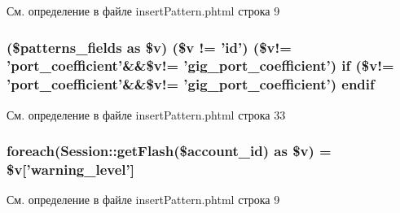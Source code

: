См. определение в файле insert\-Pattern.\-phtml строка 9

\hypertarget{insert_pattern_8phtml_afd53a91464451c8aabda435ff44bd275}{
\subsubsection[{endif}]{(\$patterns\-\_\-fields as \$v) (\$v != 'id') (\$v!= 'port\-\_\-coefficient'\&\&\$v!= 'gig\-\_\-port\-\_\-coefficient') if (\$v!= 'port\-\_\-coefficient'\&\&\$v!= 'gig\-\_\-port\-\_\-coefficient') endif}}\label{insert_pattern_8phtml_afd53a91464451c8aabda435ff44bd275}


См. определение в файле insert\-Pattern.\-phtml строка 33

\hypertarget{insert_pattern_8phtml_a1c191ff1be2612f80eabc75951f1841b}{
\subsubsection[{foreach}]{\setlength{\rightskip}{0pt plus 5cm}foreach({\bf Session\-::get\-Flash}(\$account\-\_\-id) as \$v) = \$v\mbox{[}'warning\-\_\-level'\mbox{]}}}\label{insert_pattern_8phtml_a1c191ff1be2612f80eabc75951f1841b}


См. определение в файле insert\-Pattern.\-phtml строка 9

